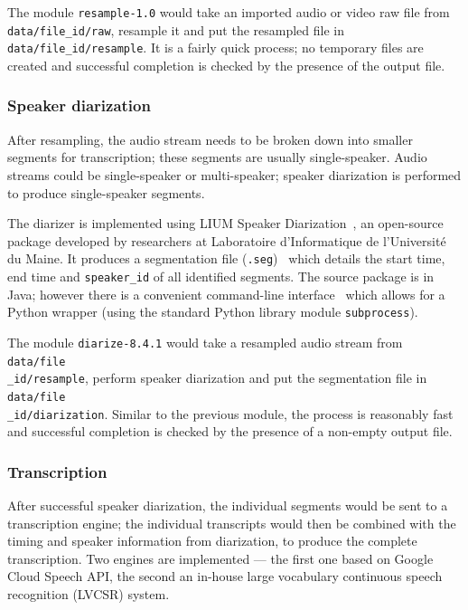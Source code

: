 The module \texttt{resample-1.0} would take an imported audio or video raw file from \texttt{data/file\_id/raw}, resample it and put the resampled file in \texttt{data/file\_id/resample}. It is a fairly quick process; no temporary files are created and successful completion is checked by the presence of the output file.

\subsubsection{Speaker diarization}

After resampling, the audio stream needs to be broken down into smaller segments
for transcription; these segments are usually single-speaker. Audio streams could
be single-speaker or multi-speaker; speaker diarization is performed to produce
single-speaker segments.

The diarizer is implemented using LIUM Speaker Diarization~\cite{lium}, an
open-source package developed by researchers at Laboratoire d'Informatique de
l'Université du Maine. It produces a segmentation file 
(\texttt{.seg})~\cite{lium-seg} which details the start time, end time and
\texttt{speaker\_id} of all identified segments. The source package is in Java;
however there is a convenient command-line interface~\cite{lium} which allows
for a Python wrapper (using the standard Python library module
\texttt{subprocess}).

The module \texttt{diarize-8.4.1} would take a resampled audio stream from
\texttt{data/file\\ \_id/resample}, perform speaker diarization and put the
segmentation file in \texttt{data/file\\ \_id/diarization}. Similar to the
previous module, the process is reasonably fast and successful completion is
checked by the presence of a non-empty output file.

\subsubsection{Transcription}

After successful speaker diarization, the individual segments would be sent
to a transcription engine; the individual transcripts would then be combined
with the timing and speaker information from diarization, to produce the complete
transcription. Two engines are implemented --- the first one based on Google
Cloud Speech API, the second an in-house large vocabulary continuous speech
recognition (LVCSR) system.

